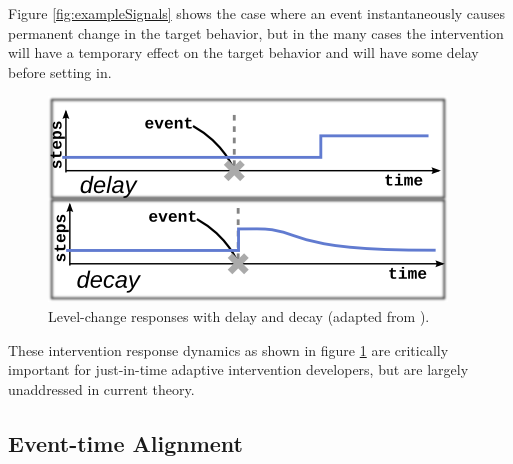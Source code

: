 Figure \ref{fig:exampleSignals} shows the case where an event instantaneously causes permanent change in the target behavior, but in the many cases the intervention will have a temporary effect on the target behavior and will have some delay before setting in.

\begin{figure}
\centering
\includegraphics[width=0.6\columnwidth]{./img/exampleDynamicComplications.png}
\caption{Level-change responses with delay and decay (adapted from \cite{glass1975}).}
\label{fig:exampleComplications}
\end{figure}

These intervention response dynamics as shown in figure \ref{fig:exampleComplications} are critically important for just-in-time adaptive intervention developers, but are largely unaddressed in current theory.

\subsection{Event-time Alignment}

